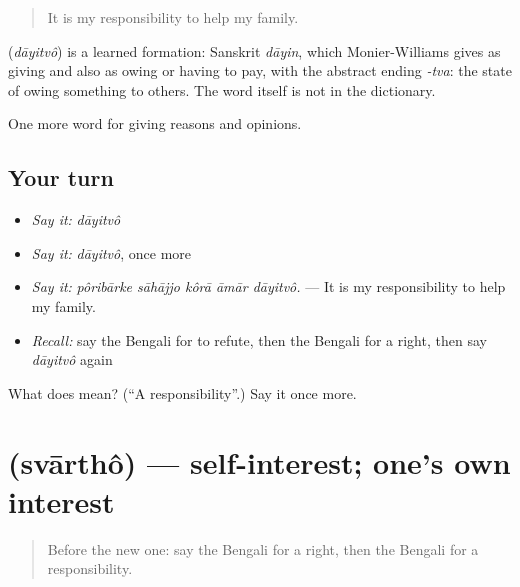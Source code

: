 \begin{quote}
It is my responsibility to help my family.
\end{quote}

\begin{cousinweb}
\textbf{} (\emph{dāyitvô}) is a learned formation: Sanskrit \emph{dāyin}, which Monier-Williams gives as giving and also as owing or having to pay, with the abstract ending \emph{-tva}: the state of owing something to others. The word itself is not in the dictionary.
\end{cousinweb}

\begin{grammarlens}[title={What you've built}]
One more word for giving reasons and opinions.
\end{grammarlens}

\subsection*{Your turn}
\begin{itemize}
\raggedright
  \item \emph{Say it:} \emph{dāyitvô}
  \item \emph{Say it:} \emph{dāyitvô}, once more
  \item \emph{Say it:} \emph{pôribārke sāhājjo kôrā āmār dāyitvô.} — It is my responsibility to help my family.
  \item \emph{Recall:} say the Bengali for to refute, then the Bengali for a right, then say \emph{dāyitvô} again
\end{itemize}

\begin{tcolorbox}[breakable,colback=teal!4,colframe=teal!35!black,title={Before you move on}]
What does  mean? (\textquotedblleft{}A responsibility\textquotedblright{}.) Say it once more.
\end{tcolorbox}
\section[\texorpdfstring{\bn{স্বার্থ} (svārthô)}{স্বার্থ (svārthô)}]{ (svārthô) — self-interest; one's own interest}

\label{lesson:BN-C339-svartho}



\begin{quote}
Before the new one: say the Bengali for a right, then the Bengali for a responsibility.
\end{quote}

